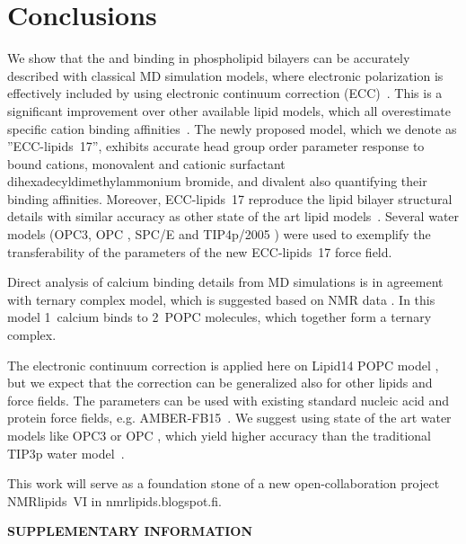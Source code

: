\documentclass[aip,jcp,twocolumn]{revtex4}
\begin{document}
\section{Conclusions}
We show that the  and  binding in phospholipid bilayers can
be accurately described with classical MD simulation models, where electronic
polarization is effectively included by using electronic continuum correction (ECC)~\cite{leontyev11}.
This is a significant improvement over other available lipid models,
which all overestimate specific cation binding affinities~\cite{catte16}.  
The newly proposed model, which we denote as ''ECC-lipids~17'', 
exhibits accurate head group order parameter response to
bound cations, monovalent  and cationic surfactant dihexadecyldimethylammonium bromide, 
and divalent 
also quantifying their binding affinities.
Moreover, ECC-lipids~17 reproduce the lipid bilayer structural details
with similar accuracy as other state of the art lipid models~\cite{catte16}.
Several water models 
(OPC3\cite{Izadi16}, OPC \cite{Izadi14}, SPC/E \cite{Berendsen1987} and TIP4p/2005 \cite{Abascal2005}) 
were used to exemplify the transferability of 
the parameters of the new ECC-lipids~17 force field. 

Direct analysis of calcium binding details from MD simulations is in agreement
with ternary complex model, which is suggested based on NMR data \cite{altenbach84}.
In this model 1~calcium binds to 2~POPC molecules, which together form a ternary
complex.

The electronic continuum correction is applied here on Lipid14 POPC model \cite{dickson14},
but we expect that the correction can be generalized also for other lipids
and force fields.
The parameters can be used with existing standard nucleic acid and protein force fields, e.g. AMBER-FB15~\cite{Wang2017}. 
We suggest using state of the art water models like OPC3\cite{Izadi16} or OPC \cite{Izadi14},
which yield higher accuracy than the traditional TIP3p water model~\cite{jorgensen83}.


This work will serve as a foundation stone of a 
new open-collaboration project NMRlipids~VI in nmrlipids.blogspot.fi. 



\begin{acknowledgments}
\end{acknowledgments}
\newpage
\appendix
\begin{center}
{\bf SUPPLEMENTARY INFORMATION}
\end{center}





\listoftodos
\end{document}
